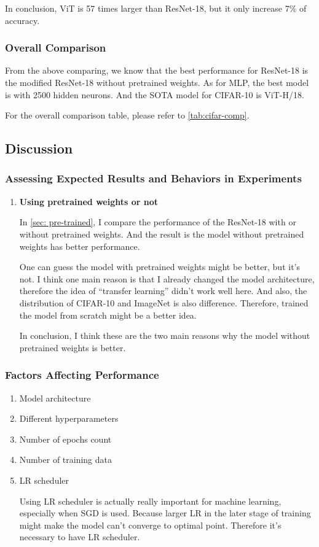 \documentclass[twocolumn]{extarticle}
\begin{document}
In conclusion, ViT is 57 times larger than ResNet-18, but it only increase 7\% of accuracy.

\subsubsection{Overall Comparison}

From the above comparing, we know that the best performance for ResNet-18 is the modified ResNet-18 without pretrained weights. As for MLP, the best model is with 2500 hidden neurons. And the SOTA model for CIFAR-10 is ViT-H/18. 

For the overall comparison table, please refer to \autoref{tab:cifar-comp}.

\subsection{Discussion}

\subsubsection{Assessing Expected Results and Behaviors in Experiments}\label{sec: discuss-1}

\begin{enumerate}
\item \textbf{Using pretrained weights or not}

In \ref{sec: pre-trained}, I compare the performance of the ResNet-18 with or without pretrained weights. And the result is the model without pretrained weights has better performance.

One can guess the model with pretrained weights might be better, but it's not. I think one main reason is that I already changed the model architecture, therefore the idea of ``transfer learning'' didn't work well here. And also, the distribution of CIFAR-10 and ImageNet is also difference. Therefore, trained the model from scratch might be a better idea.

In conclusion, I think these are the two main reasons why the model without pretrained weights is better.

\end{enumerate}

\subsubsection{Factors Affecting Performance}

\begin{enumerate}
\item Model architecture
\item Different hyperparameters
\item Number of epochs count
\item Number of training data
\item LR scheduler

Using LR scheduler is actually really important for machine learning, especially when SGD is used. Because larger LR in the later stage of training might make the model can't converge to optimal point. Therefore it's necessary to have LR scheduler.
\end{enumerate}
\end{document}
